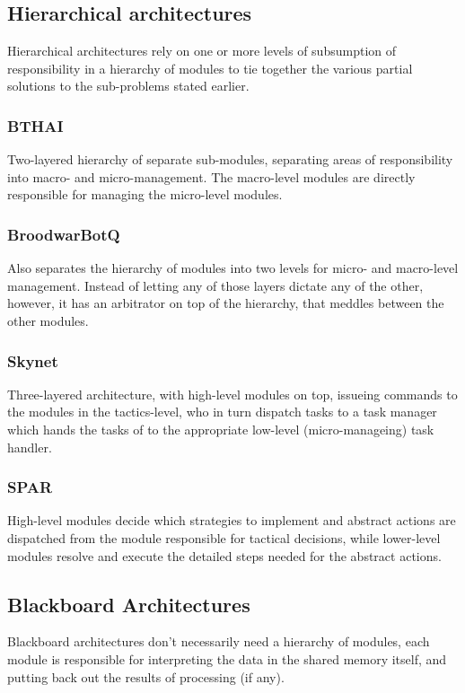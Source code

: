 \subsection{Hierarchical architectures}
Hierarchical architectures rely on one or more levels of subsumption of
responsibility in a hierarchy of modules to tie together the various partial
solutions to the sub-problems stated earlier.

\subsubsection{BTHAI}
Two-layered hierarchy of separate sub-modules, separating areas of
responsibility into macro- and micro-management. The macro-level modules are
directly responsible for managing the micro-level modules.

\subsubsection{BroodwarBotQ}
Also separates the hierarchy of modules into two levels for micro- and
macro-level management. Instead of letting any of those layers dictate any of
the other, however, it has an arbitrator on top of the hierarchy, that meddles
between the other modules.

\subsubsection{Skynet}
Three-layered architecture, with high-level modules on top, issueing commands
to the modules in the tactics-level, who in turn dispatch tasks to a task
manager which hands the tasks of to the appropriate low-level
(micro-manageing) task handler.

\subsubsection{SPAR}
High-level modules decide which strategies to implement and abstract actions
are dispatched from the module responsible for tactical decisions, while
lower-level modules resolve and execute the detailed steps needed for the
abstract actions.

\subsection{Blackboard Architectures}
Blackboard architectures don't necessarily need a hierarchy of modules, each
module is responsible for interpreting the data in the shared memory itself,
and putting back out the results of processing (if any).

